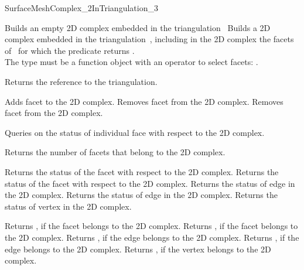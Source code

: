 \begin{ccRefConcept}{SurfaceMeshComplex_2InTriangulation_3}
\ccCreation
{}  %

{}
 {Builds an empty 2D complex embedded in the triangulation~}
\ccGlue
{}
{Builds a 2D complex embedded in the triangulation~,
including in the 2D complex the facets of~ for 
 which the predicate  returns .\\
The type  must be
a function object with an operator to select facets:
.}


{Returns the reference to the triangulation.}

\ccGlue
{}
{Adds facet  to the 2D complex.}
\ccGlue
{}
{Removes facet  from  the 2D complex.}
\ccGlue
{}
{Removes facet  from the 2D complex.}

Queries on the status  of individual face with respect to the 2D complex.

{Returns the number of facets that belong to the 2D complex.}

{Returns the status of the facet   with respect to  the 2D complex.}
\ccGlue
{}
{Returns the status of the facet  with respect to  the 2D complex.}
\ccGlue
{}
{Returns the status of edge  in the 2D complex.}
\ccGlue
{}
{Returns the status of edge   in the 2D complex.}
\ccGlue
{}
{Returns the status of vertex  in the 2D complex.}


{Returns , if the facet  belongs to the 2D complex.}
\ccGlue
{}
{Returns , if the facet  belongs to the 2D complex.}
\ccGlue
{}
{Returns , if the edge   belongs to the 2D complex.}
\ccGlue
{}
{Returns , if the edge  belongs to the 2D complex.}
\ccGlue
{}
{Returns , if the vertex  belongs to the 2D complex.}



\end{ccRefConcept}
